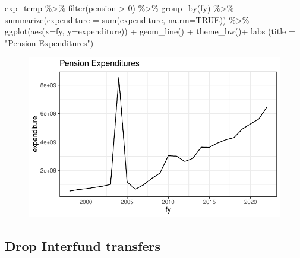 \documentclass[
  letterpaper,
  DIV=11,
  numbers=noendperiod]{scrreport}
\newenvironment{Shaded}{\begin{snugshade}}{\end{snugshade}}
\newcommand{\AttributeTok}[1]{\textcolor[rgb]{0.40,0.45,0.13}{#1}}
\newcommand{\ConstantTok}[1]{\textcolor[rgb]{0.56,0.35,0.01}{#1}}
\newcommand{\DecValTok}[1]{\textcolor[rgb]{0.68,0.00,0.00}{#1}}
\newcommand{\FunctionTok}[1]{\textcolor[rgb]{0.28,0.35,0.67}{#1}}
\newcommand{\NormalTok}[1]{\textcolor[rgb]{0.00,0.23,0.31}{#1}}
\newcommand{\SpecialCharTok}[1]{\textcolor[rgb]{0.37,0.37,0.37}{#1}}
\newcommand{\StringTok}[1]{\textcolor[rgb]{0.13,0.47,0.30}{#1}}
\begin{document}
\begin{Shaded}
\begin{Highlighting}[]
\NormalTok{exp\_temp }\SpecialCharTok{\%\textgreater{}\%} 
 \FunctionTok{filter}\NormalTok{(pension }\SpecialCharTok{\textgreater{}} \DecValTok{0}\NormalTok{) }\SpecialCharTok{\%\textgreater{}\%}  
  \FunctionTok{group\_by}\NormalTok{(fy) }\SpecialCharTok{\%\textgreater{}\%} 
  \FunctionTok{summarize}\NormalTok{(}\AttributeTok{expenditure =} \FunctionTok{sum}\NormalTok{(expenditure, }\AttributeTok{na.rm=}\ConstantTok{TRUE}\NormalTok{)) }\SpecialCharTok{\%\textgreater{}\%}
  \FunctionTok{ggplot}\NormalTok{(}\FunctionTok{aes}\NormalTok{(}\AttributeTok{x=}\NormalTok{fy, }\AttributeTok{y=}\NormalTok{expenditure)) }\SpecialCharTok{+}
  \FunctionTok{geom\_line}\NormalTok{() }\SpecialCharTok{+} 
  \FunctionTok{theme\_bw}\NormalTok{()}\SpecialCharTok{+}
  \FunctionTok{labs}\NormalTok{ (}\AttributeTok{title =} \StringTok{"Pension Expenditures"}\NormalTok{)}
\end{Highlighting}
\end{Shaded}

\begin{figure}[H]

{\centering \includegraphics{./Everything_files/figure-pdf/pensions-POB-2.pdf}

}

\end{figure}

\hypertarget{drop-interfund-transfers}{%
\subsection{Drop Interfund transfers}\label{drop-interfund-transfers}}
\end{document}
